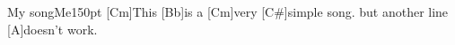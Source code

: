 \begin{song}{My song}{Me}{150pt}
%
[Cm]This [Bb]is a [Cm]very [C#]simple song.
but another line [A]doesn't work.
\end{song}
